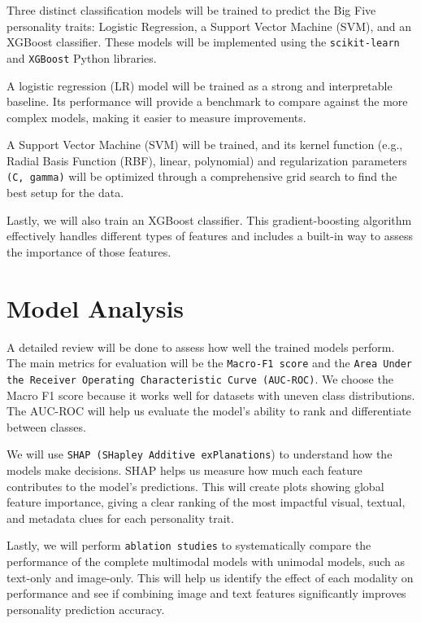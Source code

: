 Three distinct classification models will be trained to predict the Big Five personality traits: Logistic Regression, a Support Vector Machine (SVM), and an XGBoost classifier. These models will be implemented using the \texttt{scikit-learn} \citep{pedregosa2011} and \texttt{XGBoost} \citep{chen2016}  Python libraries.

A logistic regression (LR) model will be trained as a strong and interpretable baseline. Its performance will provide a benchmark to compare against the more complex models, making it easier to measure improvements.  

A Support Vector Machine (SVM) will be trained, and its kernel function (e.g., Radial Basis Function (RBF), linear, polynomial) and regularization parameters \texttt{(C, gamma)} will be optimized through a comprehensive grid search to find the best setup for the data.

Lastly, we will also train an XGBoost classifier. This gradient-boosting algorithm effectively handles different types of features and includes a built-in way to assess the importance of those features.

\section{Model Analysis}
\label{subsec:analysis}
A detailed review will be done to assess how well the trained models perform. The main metrics for evaluation will be the \texttt{Macro-F1 score} and the \texttt{Area Under the Receiver Operating Characteristic Curve (AUC-ROC)}. We choose the Macro F1 score because it works well for datasets with uneven class distributions. The AUC-ROC will help us evaluate the model's ability to rank and differentiate between classes. 

We will use \texttt{SHAP (SHapley Additive exPlanations}) to understand how the models make decisions. SHAP helps us measure how much each feature contributes to the model's predictions. This will create plots showing global feature importance, giving a clear ranking of the most impactful visual, textual, and metadata clues for each personality trait. 

Lastly, we will perform \texttt{ablation studies} to systematically compare the performance of the complete multimodal models with unimodal models, such as text-only and image-only. This will help us identify the effect of each modality on performance and see if combining image and text features significantly improves personality prediction accuracy.
